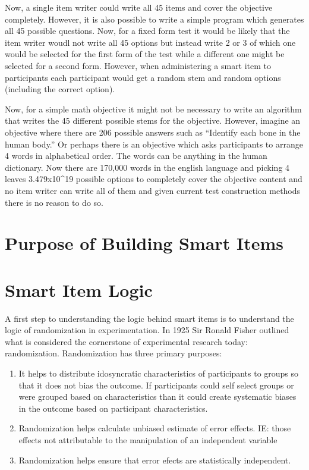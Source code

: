 \documentclass[]{book}
\theoremstyle{definition}
\theoremstyle{definition}
\theoremstyle{definition}
\theoremstyle{remark}
\begin{document}
Now, a single item writer could write all 45 items and cover the
objective completely. However, it is also possible to write a simple
program which generates all 45 possible questions. Now, for a fixed form
test it would be likely that the item writer woudl not write all 45
options but instead write 2 or 3 of which one would be selected for the
first form of the test while a different one might be selected for a
second form. However, when administering a smart item to participants
each participant would get a random stem and random options (including
the correct option).

Now, for a simple math objective it might not be necessary to write an
algorithm that writes the 45 different possible stems for the objective.
However, imagine an objective where there are 206 possible answers such
as ``Identify each bone in the human body.'' Or perhaps there is an
objective which asks participants to arrange 4 words in alphabetical
order. The words can be anything in the human dictionary. Now there are
170,000 words in the english language and picking 4 leaves
3.479x10\^{}19 possible options to completely cover the objective
content and no item writer can write all of them and given current test
construction methods there is no reason to do so.

\section{Purpose of Building Smart
Items}\label{purpose-of-building-smart-items}

\section{Smart Item Logic}\label{smart-item-logic}

A first step to understanding the logic behind smart items is to
understand the logic of randomization in experimentation. In 1925 Sir
Ronald Fisher outlined what is considered the cornerstone of
experimental research today: randomization. Randomization has three
primary purposes:

\begin{enumerate}
\def\labelenumi{\arabic{enumi})}
\item
  It helps to distribute idosyncratic characteristics of participants to
  groups so that it does not bias the outcome. If participants could
  self select groups or were grouped based on characteristics than it
  could create systematic biases in the outcome based on participant
  characteristics.
\item
  Randomization helps calculate unbiased estimate of error effects. IE:
  those effects not attributable to the manipulation of an independent
  variable
\item
  Randomization helps ensure that error efects are statistically
  independent.
\end{enumerate}
\end{document}
